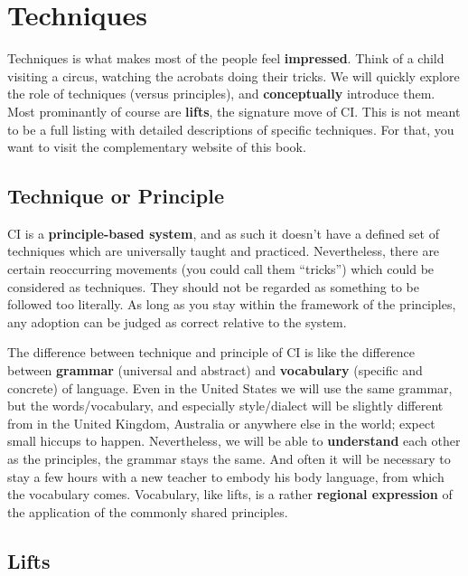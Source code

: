 \chapter{Techniques}\label{ch:techniques}


Techniques is what makes most of the people feel \textbf{impressed}.
Think of a child visiting a circus, watching the acrobats doing their tricks.
We will quickly explore the role of techniques (versus principles), and \textbf{conceptually} introduce them.
Most prominantly of course are \textbf{lifts}, the signature move of CI\@.
This is not meant to be a full listing with detailed descriptions of specific techniques.
For that, you want to visit the complementary website of this book.

\section{Technique or Principle}\label{sec:technique-or-principle}

CI is a \textbf{principle-based system}, and as such it doesn't have a defined set of techniques which are universally taught and practiced.
Nevertheless, there are certain reoccurring movements (you could call them ``tricks'') which could be considered as techniques.
They should not be regarded as something to be followed too literally.
As long as you stay within the framework of the principles, any adoption can be judged as correct relative to the system.

The difference between technique and principle of CI is like the difference between \textbf{grammar} (universal and abstract) and \textbf{vocabulary} (specific and concrete) of language.
Even in the United States we will use the same grammar, but the words/vocabulary, and especially style/dialect will be slightly different from in the United Kingdom, Australia or anywhere else in the world; expect small hiccups to happen.
Nevertheless, we will be able to \textbf{understand} each other as the principles, the grammar stays the same.
And often it will be necessary to stay a few hours with a new teacher to embody his body language, from which the vocabulary comes.
Vocabulary, like lifts, is a rather \textbf{regional expression} of the application of the commonly shared principles.

\section{Lifts}\label{sec:lifts}

